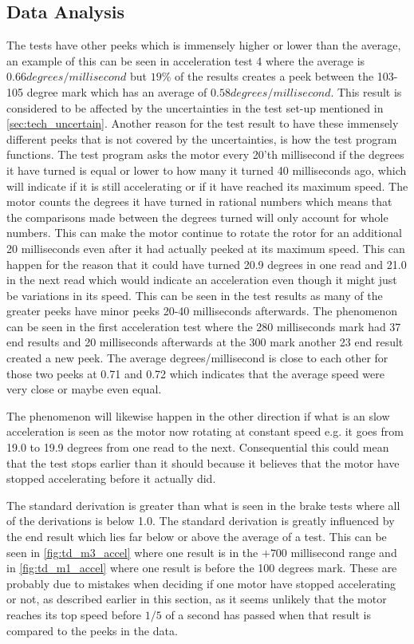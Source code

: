 \subsection{Data Analysis}
The tests have other peeks which is immensely higher or lower than the average, an example of this can be seen in acceleration test 4 where the average is $0.66 degrees/millisecond$ but $19\%$ of the results creates a peek between the 103-105 degree mark which has an average of $0.58 degrees/millisecond$. This result is considered to be affected by the uncertainties in the test set-up mentioned in \cref{sec:tech_uncertain}. Another reason for the test result to have these immensely different peeks that is not covered by the uncertainties, is how the test program functions. The test program asks the motor every 20'th millisecond if the degrees it have turned is equal or lower to how many it turned 40 milliseconds ago, which will indicate if it is still accelerating or if it have reached its maximum speed. The motor counts the degrees it have turned in rational numbers which means that the comparisons made between the degrees turned will only account for whole numbers. This can make the motor continue to rotate the rotor for an additional 20 milliseconds even after it had actually peeked at its maximum speed. This can happen for the reason that it could have turned 20.9 degrees in one read and 21.0 in the next read which would indicate an acceleration even though it might just be variations in its speed. This can be seen in the test results as many of the greater peeks have minor peeks 20-40 milliseconds afterwards. The phenomenon can be seen in the first acceleration test where the 280 milliseconds mark had 37 end results and 20 milliseconds afterwards at the 300 mark another 23 end result created a new peek. The average degrees/millisecond is close to each other for those two peeks at 0.71 and 0.72 which indicates that the average speed were very close or maybe even equal.

The phenomenon will likewise happen in the other direction if what is an slow acceleration is seen as the motor now rotating at constant speed e.g. it goes from 19.0 to 19.9 degrees from one read to the next. Consequential this could mean that the test stops earlier than it should because it believes that the motor have stopped accelerating before it actually did.

The standard derivation is greater than what is seen in the brake tests where all of the derivations is below 1.0. The standard derivation is greatly influenced by the end result which lies far below or above the average of a test. This can be seen in \cref{fig:td_m3_accel} where one result is in the $+700$ millisecond range and in \cref{fig:td_m1_accel} where one result is before the 100 degrees mark. These are probably due to mistakes when deciding if one motor have stopped accelerating or not, as described earlier in this section, as it seems unlikely that the motor reaches its top speed before $1/5$ of a second has passed when that result is compared to the peeks in the data.

